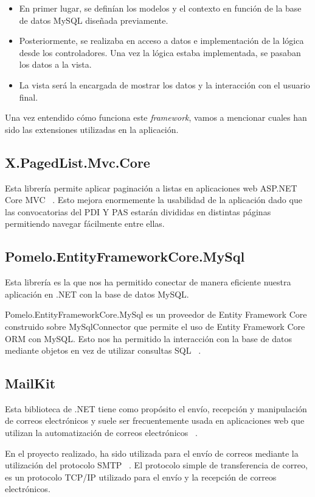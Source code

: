 \begin{itemize}
    \item En primer lugar, se definían los modelos y el contexto en función de la base de datos MySQL diseñada previamente.
    \item Posteriormente, se realizaba en acceso a datos e implementación de la lógica desde los controladores. Una vez la lógica estaba implementada, se pasaban los datos a la vista.
    \item La vista será la encargada de mostrar los datos y la interacción con el usuario final.
\end{itemize}

Una vez entendido cómo funciona este \textit{framework}, vamos a mencionar cuales han sido las extensiones utilizadas en la aplicación.

\subsection{X.PagedList.Mvc.Core}
Esta librería permite aplicar paginación a listas en aplicaciones web ASP.NET Core MVC ~\cite{pagedlist:latex}.
Esto mejora enormemente la usabilidad de la aplicación dado que las convocatorias del PDI Y PAS estarán divididas en distintas páginas permitiendo navegar fácilmente entre ellas.


\subsection{Pomelo.EntityFrameworkCore.MySql}
Esta librería es la que nos ha permitido conectar de manera eficiente nuestra aplicación en .NET con la base de datos MySQL.

Pomelo.EntityFrameworkCore.MySql es un proveedor de Entity Framework Core construido sobre MySqlConnector que permite el uso de Entity Framework Core ORM con MySQL. Esto nos ha permitido la interacción con la base de datos mediante objetos en vez de utilizar consultas SQL ~\cite{pomelomysql:latex}. 

\subsection{MailKit}
Esta biblioteca de .NET tiene como propósito el envío, recepción y manipulación de correos electrónicos y suele ser frecuentemente usada en aplicaciones web que utilizan la automatización de correos electrónicos ~\cite{mailkit:latex}.

En el proyecto realizado, ha sido utilizada para el envío de correos mediante la utilización del protocolo SMTP ~\cite{smtp:latex}. El protocolo simple de transferencia de correo, es un protocolo TCP/IP utilizado para el envío y la recepción de correos electrónicos.

